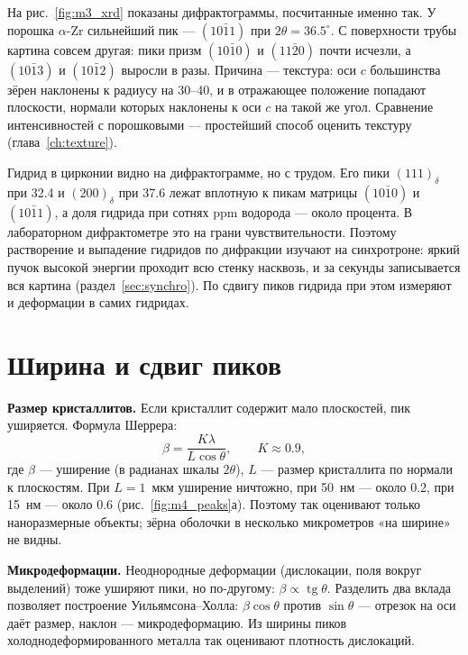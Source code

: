 На рис.~\ref{fig:m3_xrd} показаны дифрактограммы, посчитанные именно так. У порошка $\alpha$-Zr сильнейший пик ---
$(10\bar11)$ при $2\theta = 36.5^\circ$. С поверхности трубы картина совсем другая: пики призм $(10\bar10)$ и
$(11\bar20)$ почти исчезли, а $(10\bar13)$ и $(10\bar12)$ выросли в разы. Причина --- текстура: оси $c$ большинства
зёрен наклонены к радиусу на 30--40\textdegree, и в отражающее положение попадают плоскости, нормали которых
наклонены к оси $c$ на такой же угол. Сравнение интенсивностей с порошковыми --- простейший способ оценить текстуру
(глава~\ref{ch:texture}).

\begin{zrbox}
Гидрид в цирконии видно на дифрактограмме, но с трудом. Его пики $(111)_\delta$ при 32.4\textdegree{} и
$(200)_\delta$ при 37.6\textdegree{} лежат вплотную к пикам матрицы $(10\bar10)$ и $(10\bar11)$, а доля гидрида при
сотнях ppm водорода --- около процента. В лабораторном дифрактометре это на грани чувствительности. Поэтому
растворение и выпадение гидридов по дифракции изучают на синхротроне: яркий пучок высокой энергии проходит всю
стенку насквозь, и за секунды записывается вся картина (раздел~\ref{sec:synchro}). По сдвигу пиков гидрида при этом
измеряют и деформации в самих гидридах.
\end{zrbox}

\section{Ширина и сдвиг пиков}\label{sec:broad}

\textbf{Размер кристаллитов.} Если кристаллит содержит мало плоскостей, пик уширяется. Формула Шеррера:
\begin{equation}
\beta = \frac{K\lambda}{L\cos\theta},\qquad K\approx0.9,
\end{equation}
где $\beta$ --- уширение (в радианах шкалы $2\theta$), $L$ --- размер кристаллита по нормали к плоскостям. При $L = 1$~мкм
уширение ничтожно, при 50~нм --- около 0.2\textdegree, при 15~нм --- около 0.6\textdegree{} (рис.~\ref{fig:m4_peaks}а).
Поэтому так оценивают только наноразмерные объекты; зёрна оболочки в несколько микрометров «на ширине» не видны.

\textbf{Микродеформации.} Неоднородные деформации (дислокации, поля вокруг выделений) тоже уширяют пики, но по-другому:
$\beta\propto\operatorname{tg}\theta$. Разделить два вклада позволяет построение Уильямсона--Холла: $\beta\cos\theta$ против
$\sin\theta$ --- отрезок на оси даёт размер, наклон --- микродеформацию. Из ширины пиков холоднодеформированного металла
так оценивают плотность дислокаций.

